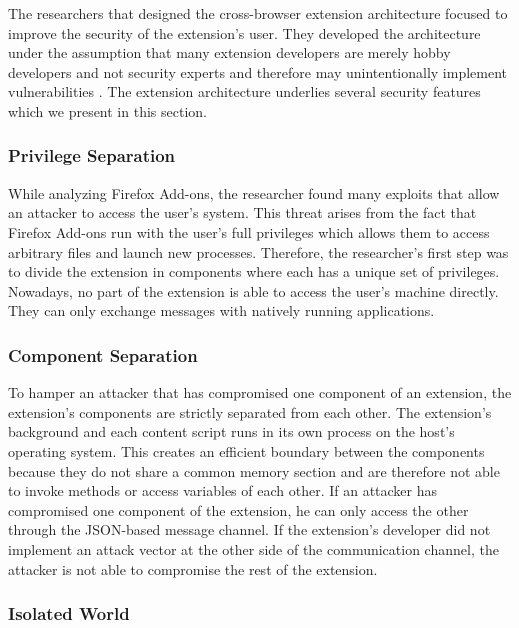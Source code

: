 	The researchers that designed the cross-browser extension architecture focused to improve the security of the extension's user. They developed the architecture under the assumption that many extension developers are merely hobby developers and not security experts and therefore may unintentionally implement vulnerabilities \cite{Barth10protectingbrowsers}. The extension architecture underlies several security features which we present in this section.
	
\subsubsection{Privilege Separation}

	While analyzing Firefox Add-ons, the researcher found many exploits that allow an attacker to access the user's system. This threat arises from the fact that Firefox Add-ons run with the user's full privileges which allows them to access arbitrary files and launch new processes. Therefore, the researcher's first step was to divide the extension in components where each has a unique set of privileges. Nowadays, no part of the extension is able to access the user's machine directly. They can only exchange messages with natively running applications. 
		
\subsubsection{Component Separation}

	To hamper an attacker that has compromised one component of an extension, the extension's components are strictly separated from each other. The extension's background and each content script runs in its own process on the host's operating system. This creates an efficient boundary between the components because they do not share a common memory section and are therefore not able to invoke methods or access variables of each other. If an attacker has compromised one component of the extension, he can only access the other through the JSON-based message channel. If the extension's developer did not implement an attack vector at the other side of the communication channel, the attacker is not able to compromise the rest of the extension. 
	
\subsubsection{Isolated World}
	

